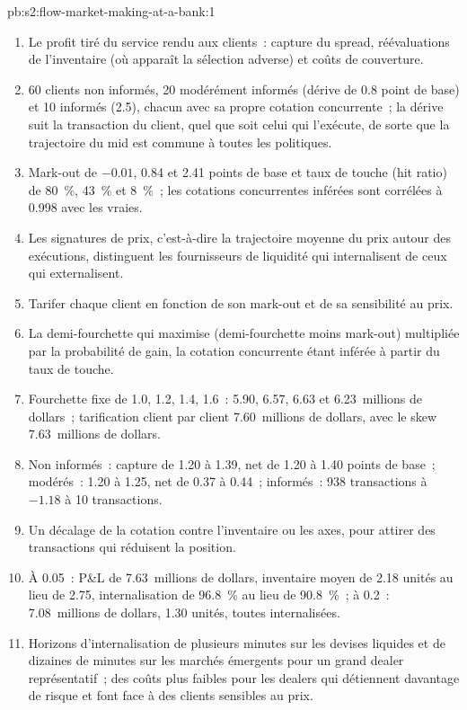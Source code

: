 \begin{solution}{pb:s2:flow-market-making-at-a-bank:1}
\begin{enumerate}
\item Le profit tiré du service rendu aux clients~: capture du spread, réévaluations de l'inventaire (où apparaît la sélection adverse) et coûts de couverture.
\item 60 clients non informés, 20 modérément informés (dérive de 0.8 point de base) et 10 informés (2.5), chacun avec sa propre cotation concurrente~; la dérive suit
la transaction du client, quel que soit celui qui l'exécute, de sorte que la trajectoire du mid est commune à toutes les politiques.
\item Mark-out de $-0.01$, 0.84 et 2.41 points de base et taux de touche (hit ratio) de 80~\%, 43~\% et 8~\%~; les cotations concurrentes inférées sont corrélées à 0.998 avec les
vraies.
\item Les signatures de prix, c'est-à-dire la trajectoire moyenne du prix autour des exécutions, distinguent les fournisseurs de liquidité qui internalisent de ceux qui externalisent.
\item Tarifer chaque client en fonction de son mark-out et de sa sensibilité au prix.
\item La demi-fourchette qui maximise (demi-fourchette moins mark-out) multipliée par la probabilité de gain, la cotation concurrente étant inférée à partir du taux de touche.
\item Fourchette fixe de 1.0, 1.2, 1.4, 1.6~: 5.90, 6.57, 6.63 et 6.23~millions de dollars~; tarification client par client 7.60~millions de dollars, avec le skew 7.63~millions de dollars.
\item Non informés~: capture de 1.20 à 1.39, net de 1.20 à 1.40 points de base~; modérés~: 1.20 à 1.25, net de 0.37 à 0.44~; informés~: 938 transactions à $-1.18$ à
10 transactions.
\item Un décalage de la cotation contre l'inventaire ou les axes, pour attirer des transactions qui réduisent la position.
\item À 0.05~: P\&L de 7.63~millions de dollars, inventaire moyen de 2.18 unités au lieu de 2.75, internalisation de 96.8~\% au lieu de 90.8~\%~; à 0.2~: 7.08~millions de dollars,
1.30 unités, toutes internalisées.
\item Horizons d'internalisation de plusieurs minutes sur les devises liquides et de dizaines de minutes sur les marchés émergents pour un grand dealer représentatif~;
des coûts plus faibles pour les dealers qui détiennent davantage de risque et font face à des clients sensibles au prix.

\end{enumerate}
\end{solution}
